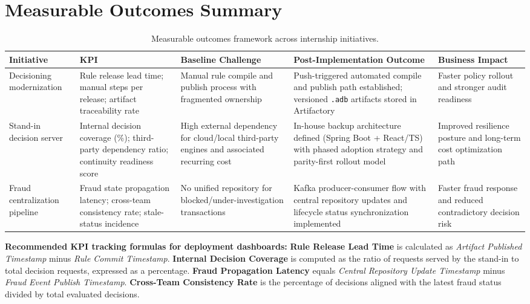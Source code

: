 \section{Measurable Outcomes Summary}

\begin{table}[h]
	\centering
	\small
	\renewcommand{\arraystretch}{1.35}
	\begin{tabular}{|p{}|p{}|p{}|p{}|p{}|}
		\hline
		\textbf{Initiative} & \textbf{KPI} & \textbf{Baseline Challenge} & \textbf{Post-Implementation Outcome} & \textbf{Business Impact} \\
		\hline
		Decisioning modernization & Rule release lead time; manual steps per release; artifact traceability rate & Manual rule compile and publish process with fragmented ownership & Push-triggered automated compile and publish path established; versioned \texttt{.adb} artifacts stored in Artifactory & Faster policy rollout and stronger audit readiness \\
		\hline
		Stand-in decision server & Internal decision coverage (\%); third-party dependency ratio; continuity readiness score & High external dependency for cloud/local third-party engines and associated recurring cost & In-house backup architecture defined (Spring Boot + React/TS) with phased adoption strategy and parity-first rollout model & Improved resilience posture and long-term cost optimization path \\
		\hline
		Fraud centralization pipeline & Fraud state propagation latency; cross-team consistency rate; stale-status incidence & No unified repository for blocked/under-investigation transactions & Kafka producer-consumer flow with central repository updates and lifecycle status synchronization implemented & Faster fraud response and reduced contradictory decision risk \\
		\hline
	\end{tabular}
	\caption{Measurable outcomes framework across internship initiatives.}
\end{table}

\textbf{Recommended KPI tracking formulas for deployment dashboards:} \textbf{Rule Release Lead Time} is calculated as \textit{Artifact Published Timestamp} minus \textit{Rule Commit Timestamp}. \textbf{Internal Decision Coverage} is computed as the ratio of requests served by the stand-in to total decision requests, expressed as a percentage. \textbf{Fraud Propagation Latency} equals \textit{Central Repository Update Timestamp} minus \textit{Fraud Event Publish Timestamp}. \textbf{Cross-Team Consistency Rate} is the percentage of decisions aligned with the latest fraud status divided by total evaluated decisions.

